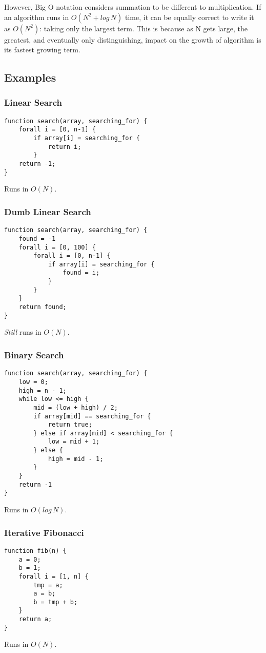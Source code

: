 \documentclass{article}
\begin{document}
However, Big O notation considers summation to be different to multiplication. If an algorithm runs in \(O(N^2 + log\,N)\) time, it can be equally correct to write it as \(O(N^2)\): taking only the largest term. This is because as N gets large, the greatest, and eventually only distinguishing, impact on the growth of algorithm is its fastest growing term. 

\subsection{Examples}
\subsubsection{Linear Search}
\begin{verbatim}
function search(array, searching_for) {
    forall i = [0, n-1] {
        if array[i] = searching_for {
            return i;
        }
    return -1;
}
\end{verbatim}
Runs in \(O(N)\).

\subsubsection{Dumb Linear Search}
\begin{verbatim}
function search(array, searching_for) {
    found = -1
    forall i = [0, 100] {
        forall i = [0, n-1] {
            if array[i] = searching_for {
                found = i;
            }
        }
    }
    return found;
}
\end{verbatim}
\emph{Still} runs in \(O(N)\).

\subsubsection{Binary Search}
\begin{verbatim}
function search(array, searching_for) {
    low = 0;
    high = n - 1;
    while low <= high {
        mid = (low + high) / 2;
        if array[mid] == searching_for {
            return true;
        } else if array[mid] < searching_for {
            low = mid + 1;
        } else {
            high = mid - 1;
        }
    }
    return -1
}
\end{verbatim}
Runs in \(O(log\,N)\).

\subsubsection{Iterative Fibonacci}
\begin{verbatim}
function fib(n) {
    a = 0;
    b = 1;
    forall i = [1, n] {
        tmp = a;
        a = b;
        b = tmp + b;
    }
    return a;
}
\end{verbatim}
Runs in \(O(N)\).
\end{document}
